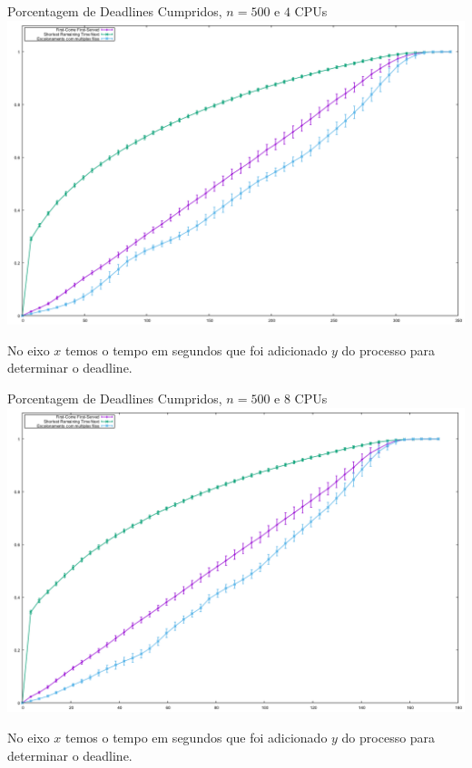\documentclass{beamer}
\begin{document}
\begin{frame}{Porcentagem de Deadlines Cumpridos, $n = 500$ e $4$ CPUs}
	\includegraphics[width=\textwidth]{graphs/testes_capella/result/deadlines-r4-500}
	
	{\tiny No eixo $x$ temos o tempo em segundos que foi adicionado $y$ do processo para determinar o deadline.}
\end{frame}


\begin{frame}{Porcentagem de Deadlines Cumpridos, $n = 500$ e $8$ CPUs}
	\includegraphics[width=\textwidth]{graphs/testes_capella/result/deadlines-r8-500}
	
	{\tiny No eixo $x$ temos o tempo em segundos que foi adicionado $y$ do processo para determinar o deadline.}
\end{frame}
\end{document}
